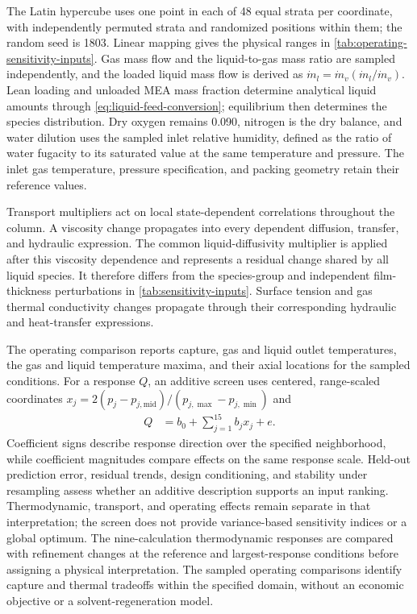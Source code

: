 The Latin hypercube uses one point in each of 48 equal strata per coordinate, with independently permuted strata and randomized positions within them; the random seed is 1803.
Linear mapping gives the physical ranges in \cref{tab:operating-sensitivity-inputs}.
Gas mass flow and the liquid-to-gas mass ratio are sampled independently, and the loaded liquid mass flow is derived as $\dot m_l=\dot m_v(\dot m_l/\dot m_v)$.
Lean loading and unloaded MEA mass fraction determine analytical liquid amounts through \cref{eq:liquid-feed-conversion}; equilibrium then determines the species distribution.
Dry oxygen remains 0.090, nitrogen is the dry balance, and water dilution uses the sampled inlet relative humidity, defined as the ratio of water fugacity to its saturated value at the same temperature and pressure.
The inlet gas temperature, pressure specification, and packing geometry retain their reference values.

Transport multipliers act on local state-dependent correlations throughout the column.
A viscosity change propagates into every dependent diffusion, transfer, and hydraulic expression.
The common liquid-diffusivity multiplier is applied after this viscosity dependence and represents a residual change shared by all liquid species.
It therefore differs from the species-group and independent film-thickness perturbations in \cref{tab:sensitivity-inputs}.
Surface tension and gas thermal conductivity changes propagate through their corresponding hydraulic and heat-transfer expressions.

The operating comparison reports capture, gas and liquid outlet temperatures, the gas and liquid temperature maxima, and their axial locations for the sampled conditions.
For a response $Q$, an additive screen uses centered, range-scaled coordinates $x_j=2(p_j-p_{j,\mathrm{mid}})/(p_{j,\max}-p_{j,\min})$ and
\begin{align}
Q &= b_0+\sum_{j=1}^{15}b_jx_j+e.
\label{eq:sensitivity-screen}
\end{align}
Coefficient signs describe response direction over the specified neighborhood, while coefficient magnitudes compare effects on the same response scale.
Held-out prediction error, residual trends, design conditioning, and stability under resampling assess whether an additive description supports an input ranking.
Thermodynamic, transport, and operating effects remain separate in that interpretation; the screen does not provide variance-based sensitivity indices or a global optimum.
The nine-calculation thermodynamic responses are compared with refinement changes at the reference and largest-response conditions before assigning a physical interpretation.
The sampled operating comparisons identify capture and thermal tradeoffs within the specified domain, without an economic objective or a solvent-regeneration model.

